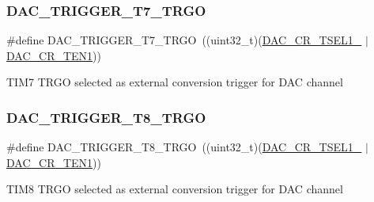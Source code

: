 \subsubsection{\texorpdfstring{DAC\_TRIGGER\_T7\_TRGO}{DAC\_TRIGGER\_T7\_TRGO}}
{\footnotesize\ttfamily \#define D\+A\+C\+\_\+\+T\+R\+I\+G\+G\+E\+R\+\_\+\+T7\+\_\+\+T\+R\+GO~((uint32\+\_\+t)(\mbox{\hyperlink{group___peripheral___registers___bits___definition_ga265e32c4fc43310acdf3ebea01376766}{D\+A\+C\+\_\+\+C\+R\+\_\+\+T\+S\+E\+L1\+\_}} $\vert$ \mbox{\hyperlink{group___peripheral___registers___bits___definition_ga998aa4fd791ea2f4626df6ddc8fc7109}{D\+A\+C\+\_\+\+C\+R\+\_\+\+T\+E\+N1}}))}

T\+I\+M7 T\+R\+GO selected as external conversion trigger for D\+AC channel \mbox{\label{group___d_a_c__trigger__selection_gaa3cbf2d9ce08165ca49172a0a62d1a66}} 
\subsubsection{\texorpdfstring{DAC\_TRIGGER\_T8\_TRGO}{DAC\_TRIGGER\_T8\_TRGO}}
{\footnotesize\ttfamily \#define D\+A\+C\+\_\+\+T\+R\+I\+G\+G\+E\+R\+\_\+\+T8\+\_\+\+T\+R\+GO~((uint32\+\_\+t)(\mbox{\hyperlink{group___peripheral___registers___bits___definition_ga8dfa13ec123c583136e24b7890add45b}{D\+A\+C\+\_\+\+C\+R\+\_\+\+T\+S\+E\+L1\+\_}} $\vert$ \mbox{\hyperlink{group___peripheral___registers___bits___definition_ga998aa4fd791ea2f4626df6ddc8fc7109}{D\+A\+C\+\_\+\+C\+R\+\_\+\+T\+E\+N1}}))}

T\+I\+M8 T\+R\+GO selected as external conversion trigger for D\+AC channel 